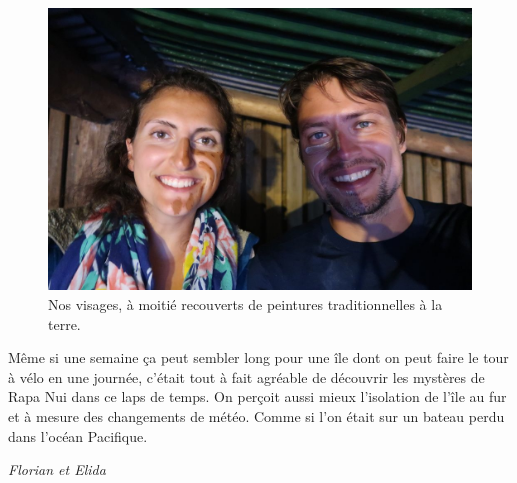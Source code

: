 \begin{figure}
\centering
\includegraphics{images/20180827_karikari.JPG}
\caption{Nos visages, à moitié recouverts de peintures traditionnelles à
la terre.}
\end{figure}

Même si une semaine ça peut sembler long pour une île dont on peut faire
le tour à vélo en une journée, c'était tout à fait agréable de découvrir
les mystères de Rapa Nui dans ce laps de temps. On perçoit aussi mieux
l'isolation de l'île au fur et à mesure des changements de météo. Comme
si l'on était sur un bateau perdu dans l'océan Pacifique.

\emph{Florian et Elida}
